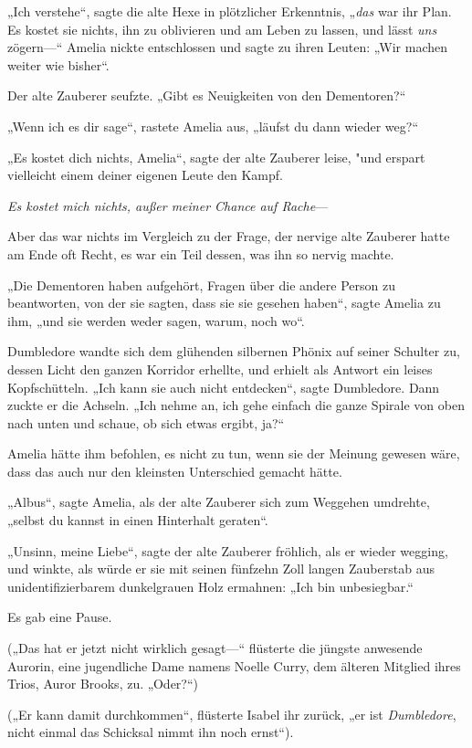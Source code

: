 {„Ich verstehe“, sagte die alte Hexe in plötzlicher Erkenntnis, „\emph{das} war ihr Plan. Es kostet sie nichts, ihn zu oblivieren und am Leben zu lassen, und lässt \emph{uns} zögern—“ Amelia nickte entschlossen und sagte zu ihren Leuten: „Wir machen weiter wie bisher“.

Der alte Zauberer seufzte. „Gibt es Neuigkeiten von den Dementoren?“

„Wenn ich es dir sage“, rastete Amelia aus, „läufst du dann wieder weg?“

„Es kostet dich nichts, Amelia“, sagte der alte Zauberer leise, "und erspart vielleicht einem deiner eigenen Leute den Kampf.

\emph{Es kostet mich nichts, außer meiner Chance auf Rache}—

Aber das war nichts im Vergleich zu der Frage, der nervige alte Zauberer hatte am Ende oft Recht, es war ein Teil dessen, was ihn so nervig machte.

„Die Dementoren haben aufgehört, Fragen über die andere Person zu beantworten, von der sie sagten, dass sie sie gesehen haben“, sagte Amelia zu ihm, „und sie werden weder sagen, warum, noch wo“.

Dumbledore wandte sich dem glühenden silbernen Phönix auf seiner Schulter zu, dessen Licht den ganzen Korridor erhellte, und erhielt als Antwort ein leises Kopfschütteln. „Ich kann sie auch nicht entdecken“, sagte Dumbledore. Dann zuckte er die Achseln. „Ich nehme an, ich gehe einfach die ganze Spirale von oben nach unten und schaue, ob sich etwas ergibt, ja?“

Amelia hätte ihm befohlen, es nicht zu tun, wenn sie der Meinung gewesen wäre, dass das auch nur den kleinsten Unterschied gemacht hätte.

„Albus“, sagte Amelia, als der alte Zauberer sich zum Weggehen umdrehte, „selbst du kannst in einen Hinterhalt geraten“.

„Unsinn, meine Liebe“, sagte der alte Zauberer fröhlich, als er wieder wegging, und winkte, als würde er sie mit seinen fünfzehn Zoll langen Zauberstab aus unidentifizierbarem dunkelgrauen Holz ermahnen: „Ich bin unbesiegbar.“

Es gab eine Pause.

(„Das hat er jetzt nicht wirklich gesagt—“ flüsterte die jüngste anwesende Aurorin, eine jugendliche Dame namens Noelle Curry, dem älteren Mitglied ihres Trios, Auror Brooks, zu. „Oder?“)

(„Er kann damit durchkommen“, flüsterte Isabel ihr zurück, „er ist \emph{Dumbledore}, nicht einmal das Schicksal nimmt ihn noch ernst“).

}
